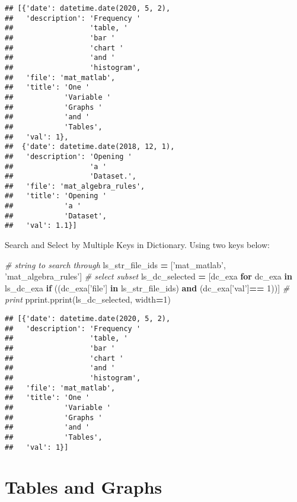 \documentclass[
]{book}
\newenvironment{Shaded}{\begin{snugshade}}{\end{snugshade}}
\newcommand{\CommentTok}[1]{\textcolor[rgb]{0.56,0.35,0.01}{\textit{#1}}}
\newcommand{\ControlFlowTok}[1]{\textcolor[rgb]{0.13,0.29,0.53}{\textbf{#1}}}
\newcommand{\DecValTok}[1]{\textcolor[rgb]{0.00,0.00,0.81}{#1}}
\newcommand{\KeywordTok}[1]{\textcolor[rgb]{0.13,0.29,0.53}{\textbf{#1}}}
\newcommand{\NormalTok}[1]{#1}
\newcommand{\OperatorTok}[1]{\textcolor[rgb]{0.81,0.36,0.00}{\textbf{#1}}}
\newcommand{\StringTok}[1]{\textcolor[rgb]{0.31,0.60,0.02}{#1}}
\begin{document}
\begin{verbatim}
## [{'date': datetime.date(2020, 5, 2),
##   'description': 'Frequency '
##                  'table, '
##                  'bar '
##                  'chart '
##                  'and '
##                  'histogram',
##   'file': 'mat_matlab',
##   'title': 'One '
##            'Variable '
##            'Graphs '
##            'and '
##            'Tables',
##   'val': 1},
##  {'date': datetime.date(2018, 12, 1),
##   'description': 'Opening '
##                  'a '
##                  'Dataset.',
##   'file': 'mat_algebra_rules',
##   'title': 'Opening '
##            'a '
##            'Dataset',
##   'val': 1.1}]
\end{verbatim}

Search and Select by Multiple Keys in Dictionary. Using two keys below:

\begin{Shaded}
\begin{Highlighting}[]
\CommentTok{# string to search through}
\NormalTok{ls_str_file_ids }\OperatorTok{=}\NormalTok{ [}\StringTok{'mat_matlab'}\NormalTok{, }\StringTok{'mat_algebra_rules'}\NormalTok{]}
\CommentTok{# select subset}
\NormalTok{ls_dc_selected }\OperatorTok{=}\NormalTok{ [dc_exa}
                  \ControlFlowTok{for}\NormalTok{ dc_exa }\KeywordTok{in}\NormalTok{ ls_dc_exa}
                  \ControlFlowTok{if}\NormalTok{ ((dc_exa[}\StringTok{'file'}\NormalTok{] }\KeywordTok{in}\NormalTok{ ls_str_file_ids) }
                      \KeywordTok{and}
\NormalTok{                      (dc_exa[}\StringTok{'val'}\NormalTok{]}\OperatorTok{==} \DecValTok{1}\NormalTok{))]}
\CommentTok{# print}
\NormalTok{pprint.pprint(ls_dc_selected, width}\OperatorTok{=}\DecValTok{1}\NormalTok{)}
\end{Highlighting}
\end{Shaded}

\begin{verbatim}
## [{'date': datetime.date(2020, 5, 2),
##   'description': 'Frequency '
##                  'table, '
##                  'bar '
##                  'chart '
##                  'and '
##                  'histogram',
##   'file': 'mat_matlab',
##   'title': 'One '
##            'Variable '
##            'Graphs '
##            'and '
##            'Tables',
##   'val': 1}]
\end{verbatim}

\hypertarget{tables-and-graphs}{%
\chapter{Tables and Graphs}\label{tables-and-graphs}}
\end{document}
